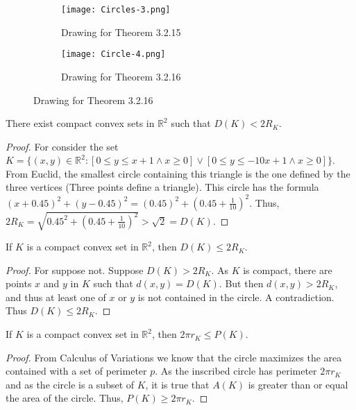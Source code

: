 \documentclass[crop=false,class=article,oneside]{standalone}
\begin{document}
        \begin{figure}[H]
          \begin{subfigure}[b]{0.49\textwidth}
             \centering
            \texttt{[image: Circles-3.png]}
            \caption{Drawing for Theorem 3.2.15}
          \end{subfigure}
          \begin{subfigure}[b]{0.49\textwidth}
            \centering
            \texttt{[image: Circle-4.png]}
            \caption{Drawing for Theorem 3.2.16}
          \end{subfigure}
        \end{figure}
        \begin{theorem}
        There exist compact convex sets in $\mathbb{R}^2$ such that $D(K) < 2R_K$.
        \end{theorem}
        \begin{proof}
        For consider the set $K=\{(x,y)\in \mathbb{R}^2: [0\leq y\leq x+1 \land x\geq 0]\lor [0\leq y\leq -10x+1\land x\geq 0]\}$. From Euclid, the smallest circle containing this triangle is the one defined by the three vertices (Three points define a triangle). This circle has the formula $(x+0.45)^2+(y-0.45)^2 = (0.45)^2 +(0.45+\frac{1}{10})^2$. Thus, $2R_K = \sqrt{0.45^2 +(0.45+\frac{1}{10})^2} > \sqrt{2} = D(K)$.
        \end{proof}
        \begin{theorem}
        If $K$ is a compact convex set in $\mathbb{R}^2$, then $D(K) \leq 2R_K$.
        \end{theorem}
        \begin{proof}
        For suppose not. Suppose $D(K) > 2R_K$. As $K$ is compact, there are points $x$ and $y$ in $K$ such that $d(x,y)=D(K)$. But then $d(x,y)>2R_K$, and thus at least one of $x$ or $y$ is not contained in the circle. A contradiction. Thus $D(K)\leq 2R_K$.
        \end{proof}
        \begin{theorem}
        If $K$ is a compact convex set in $\mathbb{R}^2$, then $2\pi r_K \leq P(K)$.
        \end{theorem}
        \begin{proof}
        From Calculus of Variations we know that the circle maximizes the area contained with a set of perimeter $p$. As the inscribed circle has perimeter $2\pi r_K$ and as the circle is a subset of $K$, it is true that $A(K)$ is greater than or equal the area of the circle. Thus, $P(K)\geq 2\pi r_K$.
        \end{proof}
\end{document}
